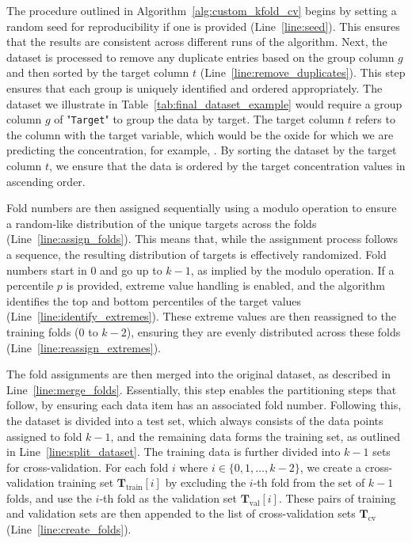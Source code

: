 The procedure outlined in Algorithm~\ref{alg:custom_kfold_cv} begins by setting a random seed for reproducibility if one is provided (Line~\ref{line:seed}).
This ensures that the results are consistent across different runs of the algorithm.
Next, the dataset is processed to remove any duplicate entries based on the group column $g$ and then sorted by the target column $t$ (Line~\ref{line:remove_duplicates}).
This step ensures that each group is uniquely identified and ordered appropriately.
The dataset we illustrate in Table~\ref{tab:final_dataset_example} would require a group column $g$ of "\texttt{Target}" to group the data by target.
The target column $t$ refers to the column with the target variable, which would be the oxide for which we are predicting the concentration, for example, .
By sorting the dataset by the target column $t$, we ensure that the data is ordered by the target concentration values in ascending order.

Fold numbers are then assigned sequentially using a modulo operation to ensure a random-like distribution of the unique targets across the folds (Line~\ref{line:assign_folds}).
This means that, while the assignment process follows a sequence, the resulting distribution of targets is effectively randomized.
Fold numbers start in 0 and go up to $k-1$, as implied by the modulo operation.
If a percentile $p$ is provided, extreme value handling is enabled, and the algorithm identifies the top and bottom percentiles of the target values (Line~\ref{line:identify_extremes}).
These extreme values are then reassigned to the training folds (0 to $k-2$), ensuring they are evenly distributed across these folds (Line~\ref{line:reassign_extremes}).

The fold assignments are then merged into the original dataset, as described in Line~\ref{line:merge_folds}.
Essentially, this step enables the partitioning steps that follow, by ensuring each data item has an associated fold number.
Following this, the dataset is divided into a test set, which always consists of the data points assigned to fold $k-1$, and the remaining data forms the training set, as outlined in Line~\ref{line:split_dataset}.
The training data is further divided into $k-1$ sets for cross-validation. 
For each fold $i$ where $i \in \{0, 1, \ldots, k-2\}$, we create a cross-validation training set $\mathbf{T}_\text{train}[i]$ by excluding the $i$-th fold from the set of $k-1$ folds, and use the $i$-th fold as the validation set $\mathbf{T}_\text{val}[i]$.
These pairs of training and validation sets are then appended to the list of cross-validation sets $\mathbf{T}_\text{cv}$ (Line~\ref{line:create_folds}).

